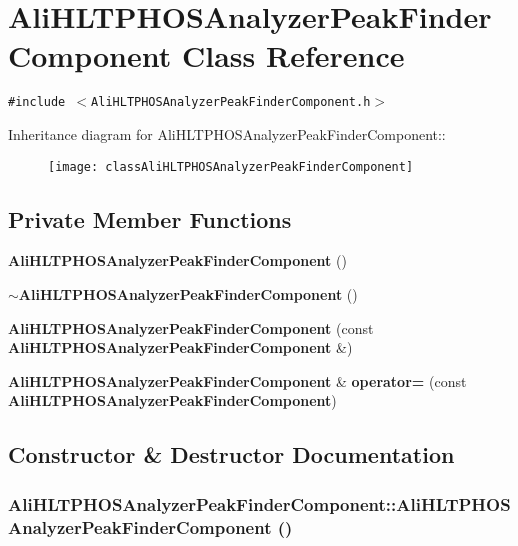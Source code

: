 \section{Ali\-HLTPHOSAnalyzer\-Peak\-Finder\-Component Class Reference}
\label{classAliHLTPHOSAnalyzerPeakFinderComponent}
{\tt \#include $<$Ali\-HLTPHOSAnalyzer\-Peak\-Finder\-Component.h$>$}

Inheritance diagram for Ali\-HLTPHOSAnalyzer\-Peak\-Finder\-Component::\begin{figure}[H]
\begin{center}
\leavevmode
\texttt{[image: classAliHLTPHOSAnalyzerPeakFinderComponent]}
\end{center}
\end{figure}
\subsection*{Private Member Functions}
\begin{CompactItemize}
\item 
{\bf Ali\-HLTPHOSAnalyzer\-Peak\-Finder\-Component} ()
\item 
{\bf $\sim$Ali\-HLTPHOSAnalyzer\-Peak\-Finder\-Component} ()
\item 
{\bf Ali\-HLTPHOSAnalyzer\-Peak\-Finder\-Component} (const {\bf Ali\-HLTPHOSAnalyzer\-Peak\-Finder\-Component} \&)
\item 
{\bf Ali\-HLTPHOSAnalyzer\-Peak\-Finder\-Component} \& {\bf operator=} (const {\bf Ali\-HLTPHOSAnalyzer\-Peak\-Finder\-Component})
\end{CompactItemize}


\subsection{Constructor \& Destructor Documentation}
\subsubsection{\setlength{\rightskip}{0pt plus 5cm}Ali\-HLTPHOSAnalyzer\-Peak\-Finder\-Component::Ali\-HLTPHOSAnalyzer\-Peak\-Finder\-Component ()\hspace{0.3cm}{\tt  [private]}}\label{classAliHLTPHOSAnalyzerPeakFinderComponent_d0}


